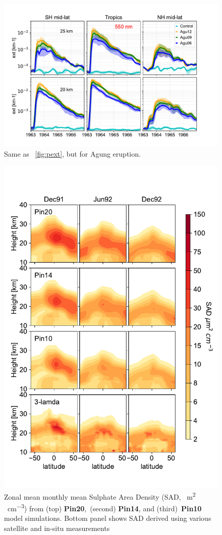 \documentclass[acpd, hvmath, online]{copernicus_discussions}
\begin{document}
\newpage
\begin{figure}[ht!]
\includegraphics[width=1.0\textwidth,height=.6\textheight,trim={0.1cm 0.1cm 0.1cm 0.1cm},clip]{Agung_ext_550.pdf}
\caption{Same as ~\ref{fig:pext}, but for Agung eruption.} 
\label{fig:aext}
\end{figure}







\newpage
\begin{figure}[ht!]
\includegraphics[width=.8\textwidth,height=.9\textheight,trim={0.1cm 0.1cm 0.1cm 0.1cm},clip]{Pin_sad.pdf}
\caption{Zonal mean monthly mean Sulphate Area Density (SAD, \unit{{\mu}m^2\,cm^{-3\xspace}}) from
 (top) \textbf{Pin20},~(second) \textbf{Pin14}, and (third)~\textbf{Pin10} model simulations.
 Bottom panel shows SAD derived using various satellite and in-situ measurements \citet{Arfeuille2013\xspace}}
\label{fig:psad}
\end{figure}
\end{document}
